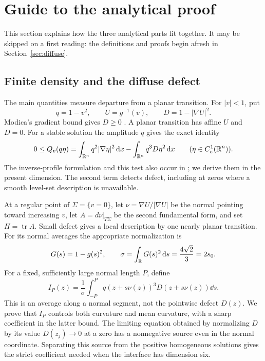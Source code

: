 \section{Guide to the analytical proof}\label{sec:analytic-strategy}

This section explains how the three analytical parts fit together.
It may be skipped on a first reading: the definitions and proofs begin
afresh in Section~\ref{sec:diffuse}.

\subsection{Finite density and the diffuse defect}

The main quantities measure departure from a planar transition.
For $|v|<1$, put
\[
 q=1-v^2,\qquad U=g^{-1}(v),\qquad D=1-|\nabla U|^2.
\]
Modica's gradient bound gives $D\ge0$ \cite{Modica1985}.
A planar transition has affine $U$ and $D=0$.
For a stable solution the amplitude $q$ gives the exact identity
\begin{equation}\label{eq:intro-defect-test}
 0\le Q_v(q\eta)
   =\int_{\mathbb R^n}q^2|\nabla\eta|^2\,\mathrm d x
     -\int_{\mathbb R^n}q^3D\eta^2\,\mathrm d x
 \qquad(\eta\in C_c^1(\mathbb R^n)).
\end{equation}
The inverse-profile formulation and this test also occur in
\citet[Lemma~2.1]{LLWWW2026}; we derive them in the present dimension.
The second term detects defect, including at zeros where a smooth
level-set description is unavailable.

At a regular point of $\Sigma=\{v=0\}$, let
$\nu=\nabla U/|\nabla U|$ be the normal pointing toward increasing $v$,
let $A=d\nu|_{T\Sigma}$ be the second fundamental form, and set
$H=\operatorname{tr}A$.
Small defect gives a local description by one nearly planar transition.
For its normal averages the appropriate normalization is
\[
 G(s)=1-g(s)^2,\qquad
 \sigma=\int_\mathbb R G(s)^2\,\mathrm d s=\frac{4\sqrt2}{3}=2s_0.
\]
For a fixed, sufficiently large normal length $P$, define
\begin{equation}\label{eq:intro-normal-average}
 I_P(z)=\frac1\sigma\int_{-P}^{P}
 q(z+s\nu(z))^3D(z+s\nu(z))\dd s.
\end{equation}
This is an average along a normal segment, not the pointwise defect
$D(z)$.
We prove that $I_P$ controls both curvature and mean curvature,
with a sharp coefficient in the latter bound.
The limiting equation obtained by normalizing $D$ by its value
$D(z_j)\to0$ at a zero has a nonnegative source even in the normal
coordinate.
Separating this source from the positive homogeneous solutions
gives the strict coefficient needed when the interface has
dimension six.


